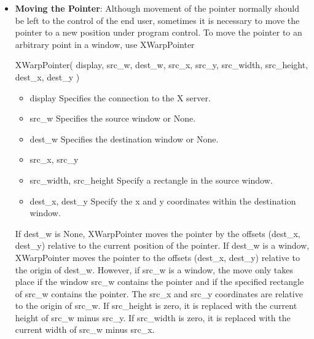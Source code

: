 \documentclass{report}
\begin{document}
\begin{itemize}
            \bigbreak \noindent 
            XAllowEvents can generate a BadValue error.
            \bigbreak \noindent 
            ReplayKeyboard and ReplayPointer mean: “Cancel my active grab, then re-process the event that caused the freeze as if my grab had not intercepted it.”
            \bigbreak \noindent 
            They are used when you grabbed an input event, looked at it, and decided not to consume it.
        \item \textbf{Moving the Pointer}: Although movement of the pointer normally should be left to the control of the end user, sometimes it is necessary to move the pointer to a new position under program control.
            \bigbreak \noindent 
            To move the pointer to an arbitrary point in a window, use XWarpPointer
            \bigbreak \noindent 
            \begin{cppcode}
                XWarpPointer(
                    display,
                    src_w, dest_w,
                    src_x, src_y, 
                    src_width, src_height,
                    dest_x, dest_y
                )
            \end{cppcode}
            \bigbreak \noindent
            \begin{itemize}
                \item display Specifies the connection to the X server.
                \item src\_w Specifies the source window or None.
                \item dest\_w Specifies the destination window or None.
                \item src\_x, src\_y
                \item src\_width, src\_height Specify a rectangle in the source window.
                \item dest\_x, dest\_y Specify the x and y coordinates within the destination window.
            \end{itemize}
            If dest\_w is None, XWarpPointer moves the pointer by the offsets (dest\_x, dest\_y) relative to the current position of the pointer. If dest\_w is a window, XWarpPointer moves the pointer to the offsets (dest\_x, dest\_y) relative to the origin of dest\_w. However, if src\_w is a window, the move only takes place if the window src\_w contains the pointer and if the specified rectangle of src\_w contains the pointer.
            \bigbreak \noindent 
            The src\_x and src\_y coordinates are relative to the origin of src\_w. If src\_height is zero, it is replaced with the current height of src\_w minus src\_y. If src\_width is zero, it is replaced with the current width of src\_w minus src\_x.

\end{itemize}
\end{document}
